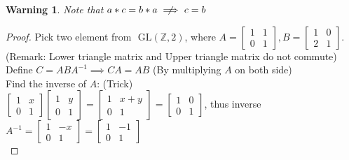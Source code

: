 \documentclass{article}
\theoremstyle{MyNonumberplain}
\theoremstyle{break}
\newtheorem*{proof}{Proof. }
\newtheorem{warning}{Warning}[section]
\theoremstyle{break}
\theoremstyle{break}
\theoremstyle{definition}
\theoremstyle{break}
\begin{document}
\begin{warnbox}
        \begin{warning}
            Note that $a*c=b*a\centernot\implies c=b$
        \end{warning}
        \begin{prfbox}
            \begin{proof}
                Pick two element from $\text{ GL} (\mathbb{Z}, 2)$, where $A =
                \left[\begin{array}{cc}
                  1 & 1\\
                  0 & 1
                \end{array}\right], B = \left[\begin{array}{cc}
                  1 & 0\\
                  2 & 1
                \end{array}\right]$.\\
                
                (Remark: Lower triangle matrix and Upper triangle matrix do not commute)\\
                
                Define $C = A B A^{- 1} \implies C A = A B$ (By multiplying $A$ on both
                side)\\
                
                Find the inverse of $A$: (Trick)\\
                
                $\left[\begin{array}{cc}
                  1 & x\\
                  0 & 1
                \end{array}\right] \left[\begin{array}{cc}
                  1 & y\\
                  0 & 1
                \end{array}\right] = \left[\begin{array}{cc}
                  1 & x + y\\
                  0 & 1
                \end{array}\right] = \left[\begin{array}{cc}
                  1 & 0\\
                  0 & 1
                \end{array}\right]$, thus inverse $A^{- 1} = \left[\begin{array}{cc}
                  1 & - x\\
                  0 & 1
                \end{array}\right] = \left[\begin{array}{cc}
                  1 & - 1\\
                  0 & 1
                \end{array}\right]$\\
                

\end{proof}
\end{prfbox}
\end{warnbox}
\end{document}
